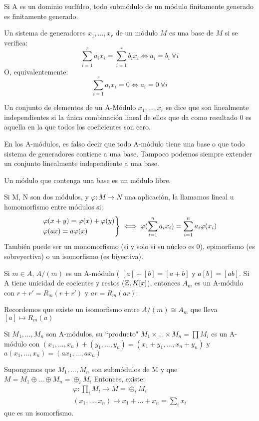 \begin{nprop}
	Si A es un dominio euclídeo, todo submódulo de un módulo finitamente generado es finitamente generado.
\end{nprop}
\begin{ndef}
	Un sistema de generadores $x_1,...,x_r$ de un módulo $M$ es una base de $M$ si se verifica:
	\[
	\sum_{i=1}^r a_i x_i = \sum_{i=1}^r b_i x_i \iff a_i = b_i \ \forall i
	\]
	O, equivalentemente:
	\[
	\sum_{i=1}^r a_ix_i = 0 \iff a_i  = 0  \ \forall i
	\]
\end{ndef}
\begin{ndef}
	Un conjunto de elementos de un A-Módulo $x_1,...,x_r$ se dice que son linealmente independientes si la única combinación lineal de ellos que da como resultado 0 es aquella en la que todos los coeficientes son cero.
\end{ndef}
\begin{nota}
	En los A-módulos, es falso decir que todo A-módulo tiene una base o que todo sistema de generadores contiene a una base. Tampoco podemos siempre extender un conjunto linealmente independiente a una base.
\end{nota}
\begin{ndef}
	Un módulo que contenga una base es un módulo libre.
\end{ndef}

\begin{ndef}
	Si M, N son dos módulos, y $\varphi:M \to N$ una aplicación, la llamamos lineal u homomorfismo entre módulos si:
	\[
	\begin{rcases}
	\varphi(x+y) = \varphi(x) + \varphi(y)\\
	\varphi(ax) = a\varphi(x)
\end{rcases} \iff \varphi(\sum_{i=1}^n a_ix_i) = \sum_{i=1}^n a_i \varphi(x_i)
	\]
	También puede ser un monomorfismo (si y solo si su núcleo es 0), epimorfismo (es sobreyectiva) o un isomorfismo (es biyectiva).
\end{ndef}
\begin{ejemplo}
	Si $m\in A$, $A/(m)$ es un A-módulo ( $[a]+[b] = [a+b]$ y $a[b] = [ab]$. Si A tiene unicidad de cocientes y restos ($\mathbb{Z},K[x]$), entonces $A_m$ es un A-módulo con $r+r' = R_m(r+r')$ y $ar = R_m(ar)$.

	Recordemos que existe un isomorfismo entre $A/(m) \cong A_m$ que lleva $[a] \mapsto R_m(a)$
\end{ejemplo}

\begin{ejemplo}[2]
	Si $M_1,...,M_n$ son A-módulos, su “producto" $M_1 \times ... \times M_n =  \prod M_i$ es un A-módulo con $(x_1,...,x_n) + (y_1,...,y_n) = (x_1+y_1,...,x_n+y_n)$  y $a(x_1,...,x_n)= (ax_1,...,ax_n)$

		Supongamos que $M_1,...,M_n$ son submódulos de M y que $M = M_1 \oplus ... \oplus M_n = \oplus_i M_i$
	Entonces, existe:
	\begin{align}
	\varphi:\prod_i M_i \to M=\oplus_i M_i \\
	(x_1,...,x_n) \mapsto x_1+...+x_n = \sum_i x_i
\end{align}
que es un isomorfismo.
\end{ejemplo}

